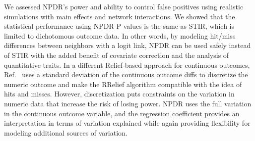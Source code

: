 \documentclass{bioinfo}
\begin{document}
We assessed NPDR's power and ability to control false positives using realistic simulations with main effects and network interactions.
We showed that the statistical performance using NPDR P values is the same as STIR, which is limited to dichotomous outcome data.
In other words, by modeling hit/miss differences between neighbors with a logit link, NPDR can be used safely instead of STIR with the added benefit of covariate correction and the analysis of quantitative traits.
In a different Relief-based approach for continuous outcomes, Ref.~\cite{urbanowicz17} uses a standard deviation of the continuous outcome diffs to discretize the numeric outcome and make the RRelief algorithm compatible with the idea of hits and misses.
However, discretization puts constraints on the variation in numeric data that increase the risk of losing power.
NPDR uses the full variation in the continuous outcome variable, and the regression coefficient provides an interpretation in terms of variation explained while again providing flexibility for modeling additional sources of variation.

\end{document}
